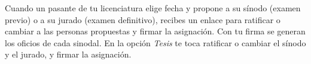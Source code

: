 \documentclass[11pt,a4paper]{article}
\begin{document}
{\small\tableofcontents}
\newpage
\begin{quevasahacer}
Cuando un pasante de tu licenciatura elige fecha y propone a su sínodo (examen previo) o a su jurado (examen definitivo), recibes un enlace para ratificar o cambiar a las personas propuestas y firmar la asignación. Con tu firma se generan los oficios de cada sinodal. En la opción \emph{Tesis} te toca ratificar o cambiar el sínodo y el jurado, y firmar la asignación.
\end{quevasahacer}



\end{document}
